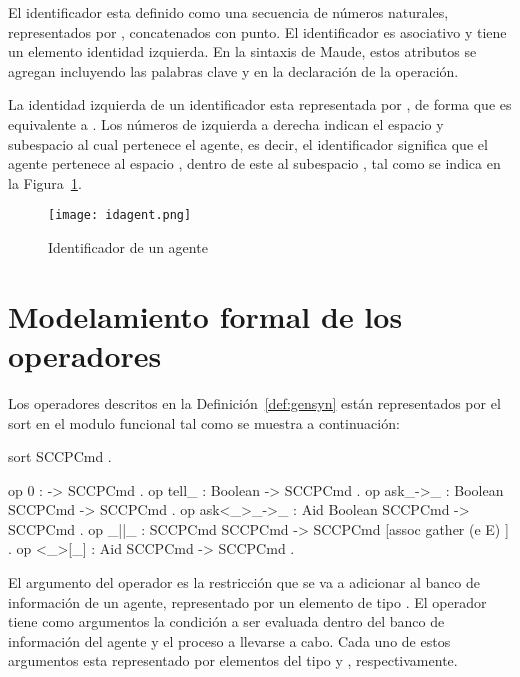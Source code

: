 El identificador esta definido como una secuencia de n\'umeros naturales, representados por , concatenados con punto. El identificador es asociativo y tiene un elemento identidad izquierda. En la sintaxis de Maude, estos atributos se agregan incluyendo las palabras clave  y  en la declaraci\'on de la operaci\'on. 

La identidad izquierda de un identificador esta representada por , de forma que  es equivalente a . Los n\'umeros de izquierda a derecha indican el espacio y subespacio al cual pertenece el agente, es decir, el identificador  significa que el agente pertenece al espacio , dentro de este al subespacio , tal como se indica en la Figura~\ref{fig:agentid}.

\begin{figure}[htbp] %
   \centering
   \texttt{[image: idagent.png]} 
   \caption{Identificador de un agente}
   \label{fig:agentid}
\end{figure}

\section{Modelamiento formal de los operadores}
\label{syntax.rew}

Los operadores descritos en la Definici\'on~\ref{def:gensyn} est\'an representados por el sort  en el modulo funcional  tal como se muestra a continuaci\'on:

\begin{maude}
  sort SCCPCmd .

  op 0 : -> SCCPCmd . 
  op tell_ : Boolean -> SCCPCmd . 
  op ask_->_ : Boolean SCCPCmd -> SCCPCmd .
  op ask<_>_->_ : Aid Boolean SCCPCmd -> SCCPCmd .
  op _||_ : SCCPCmd SCCPCmd -> SCCPCmd [assoc gather (e E) ] .
  op <_>[_] : Aid SCCPCmd -> SCCPCmd .
\end{maude}

El argumento del operador  es la restricci\'on que se va a adicionar al banco de informaci\'on de un agente, representado por un elemento de tipo . El operador  tiene como argumentos la condici\'on a ser evaluada dentro del banco de informaci\'on del agente y el proceso a llevarse a cabo. Cada uno de estos argumentos esta representado por elementos del tipo  y , respectivamente.

